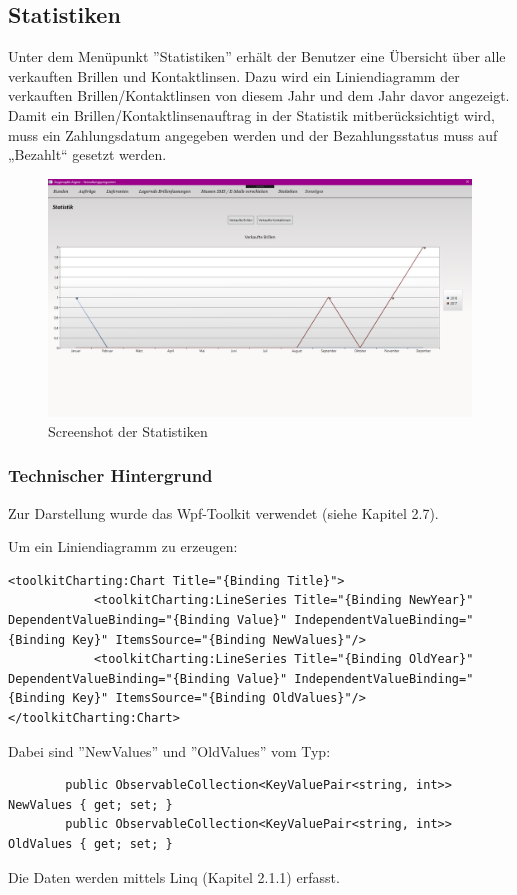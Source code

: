 \subsection{Statistiken}
Unter dem Menüpunkt ''Statistiken'' erhält der Benutzer eine Übersicht über alle verkauften Brillen und Kontaktlinsen. Dazu wird ein Liniendiagramm der verkauften Brillen/Kontaktlinsen von diesem Jahr und dem Jahr davor angezeigt. Damit ein Brillen/Kontaktlinsenauftrag in der Statistik mitberücksichtigt wird, muss ein Zahlungsdatum angegeben werden und der Bezahlungsstatus muss auf „Bezahlt“ gesetzt werden.
\begin{figure}[ht]
\begin{center}
	\includegraphics[scale=.25]{images/Statistiken.png}
\end{center}
	\caption{Screenshot der Statistiken}
	\label{fig:sample}
\end{figure}
\subsubsection{Technischer Hintergrund}
Zur Darstellung wurde das Wpf-Toolkit verwendet (siehe Kapitel 2.7).

Um ein Liniendiagramm zu erzeugen:
\begin{lstlisting}
<toolkitCharting:Chart Title="{Binding Title}">
            <toolkitCharting:LineSeries Title="{Binding NewYear}"  DependentValueBinding="{Binding Value}" IndependentValueBinding="{Binding Key}" ItemsSource="{Binding NewValues}"/>
            <toolkitCharting:LineSeries Title="{Binding OldYear}"  DependentValueBinding="{Binding Value}" IndependentValueBinding="{Binding Key}" ItemsSource="{Binding OldValues}"/>
</toolkitCharting:Chart>
\end{lstlisting}
Dabei sind ''NewValues'' und ''OldValues'' vom Typ: 
\begin{lstlisting}
        public ObservableCollection<KeyValuePair<string, int>> NewValues { get; set; }
        public ObservableCollection<KeyValuePair<string, int>> OldValues { get; set; }
\end{lstlisting}
Die Daten werden mittels Linq (Kapitel 2.1.1) erfasst.
